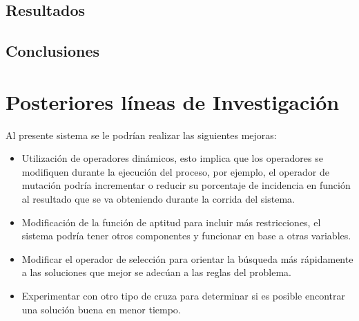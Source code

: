 \documentclass[pdftex,a4paper,10.5pt]{article}
\begin{document}
\subsection{Resultados} %


\subsection{Conclusiones} %

	
\section{Posteriores l\'ineas de Investigaci\'on} %

Al presente sistema se le podrían realizar las siguientes mejoras:

\begin{itemize}

\item  Utilizaci\'on de operadores din\'amicos, esto implica que los operadores se modifiquen durante
la ejecuci\'on del proceso, por ejemplo, el operador de mutaci\'on podr\'ia incrementar o reducir
su porcentaje de incidencia en función al resultado que se va obteniendo durante la corrida
del sistema.
\item Modificaci\'on de la funci\'on de aptitud para incluir m\'as restricciones, el sistema podr\'ia tener otros componentes y funcionar en base a otras variables. 
\item Modificar el operador de selecci\'on para orientar la b\'usqueda m\'as r\'apidamente a las soluciones que mejor se adec\'uan a las reglas del problema.
\item Experimentar con otro tipo de cruza para determinar si es posible encontrar una soluci\'on buena en menor tiempo.

\end{itemize}
\newpage
\end{document}
